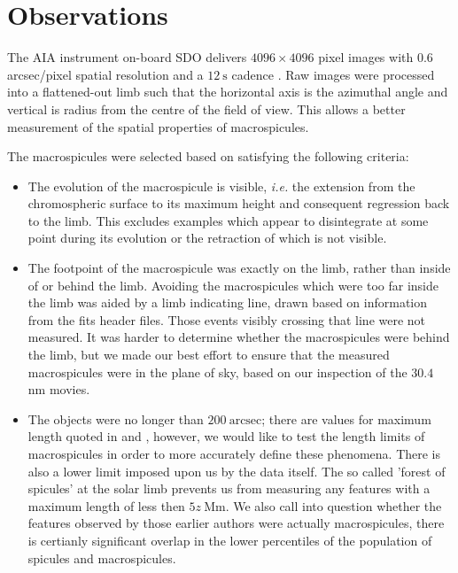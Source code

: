 \section{Observations}    
The AIA instrument on-board SDO delivers $4096 \times 4096$ pixel images with $0.6$ arcsec/pixel spatial resolution and a $12\ \textrm{s}$ cadence \citep{AIAspec}. Raw images were processed into a flattened-out limb such that the horizontal axis is the azimuthal angle and vertical is radius from the centre of the field of view. This allows a better measurement of the spatial properties of macrospicules.


The macrospicules were selected based on satisfying the following criteria: 
\begin{itemize}
	\item{ The evolution of the macrospicule is visible, \emph{i.e.} the extension from the chromospheric surface to its maximum height and consequent regression back to the limb. This excludes examples which appear to disintegrate at some point during its evolution or the retraction of which is not visible.}
	\item{The footpoint of the macrospicule was exactly on the limb, rather than inside of or behind the limb. Avoiding the macrospicules which were too far inside the limb was aided by a limb indicating line, drawn based on information from the fits header files. Those events visibly crossing that line were not measured. It was harder to determine whether the macrospicules were behind the limb, but we made our best effort to ensure that the measured macrospicules were in the plane of sky, based on our inspection of the $30.4$ nm movies.}
	\item{The objects were no longer than $200\ \textrm{arcsec}$; there are values for maximum length quoted in \citealt{Bohlin1975} and \citealt{Dere89}, however, we would like to test the length limits of macrospicules in order to more accurately define these phenomena. There is also a lower limit imposed upon us by the data itself. The so called 'forest of spicules' at the solar limb prevents us from measuring any features with a maximum length of less then $5z\ \textrm{Mm}$. We also call into question whether the features observed by those earlier authors were actually macrospicules, there is certianly significant overlap in the lower percentiles of the population of spicules and macrospicules.}
\end{itemize}


